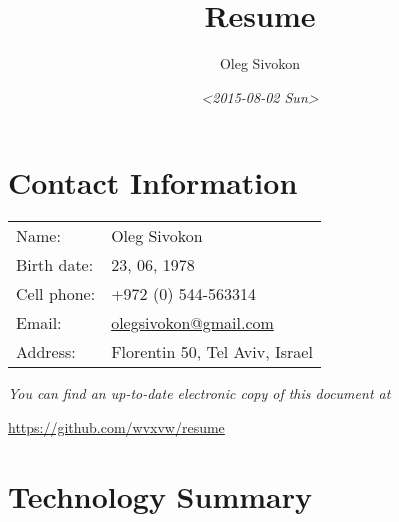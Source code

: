 \documentclass[11pt]{article}
\author{Oleg Sivokon}
\date{\textit{<2015-08-02 Sun>}}
\title{Resume}
\begin{document}
\maketitle

\section{Contact Information}
\label{sec:orgheadline1}
\begin{center}
\begin{tabular}{ll}
Name: & Oleg Sivokon\\
Birth date: & 23, 06, 1978\\
Cell phone: & +972 (0) 544-563314\\
Email: & \href{mailto:olegsivokon@gmail.com}{olegsivokon@gmail.com}\\
Address: & Florentin 50, Tel Aviv, Israel\\
\end{tabular}
\end{center}

\emph{You can find an up-to-date electronic copy of this document at}

\url{https://github.com/wvxvw/resume}

\clearpage

\section{Technology Summary}
\label{sec:orgheadline9}
\end{document}
